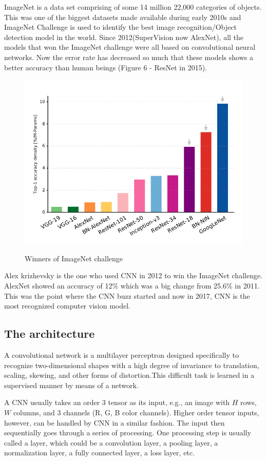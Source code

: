 \documentclass[12pt]{article}
\begin{document}
ImageNet is a data set comprising of some 14 million 22,000 categories of objects. This was one of the biggest datasets made available during early 2010s and ImageNet Challenge is used to identify the best image recognition/Object detection model in the world. Since 2012(SuperVision now AlexNet), all the models that won the ImageNet challenge were all based on convolutional neural networks. Now the error rate has decreased so much that these models shows a better accuracy than human beings (Figure 6 - ResNet in 2015). 
\begin{figure}[h]
    	\centering
    	\includegraphics[width=0.75 \textwidth]{f.png}
       	\label{fig:mesh7}
	\caption{Winners of ImageNet challenge}
	\end{figure} 
    
    Alex krizhevsky is the one who used CNN in 2012 to win the ImageNet challenge. AlexNet showed an accuracy of 12\% which was a big change from 25.6\% in 2011. This was the point where the CNN buzz started and now in 2017, CNN is the most recognized computer vision model. 
    
    \subsection{The architecture}
    
    A convolutional network is a multilayer perceptron designed specifically to recognize two-dimensional shapes with a high degree of invariance to translation, scaling, skewing, and other forms of distortion.This difficult task is learned in a supervised manner by means of a network.
    
    A CNN usually takes an order 3 tensor as its input, e.g., an image with $H$ rows, $W$ columns, and 3 channels (R, G, B color channels). Higher order tensor inputs, however, can be handled by CNN in a similar fashion. The input then sequentially goes through a series of processing. One processing step is usually called a layer, which could be a convolution layer, a pooling layer, a normalization layer, a fully connected layer, a loss layer, etc.
    
\end{document}
